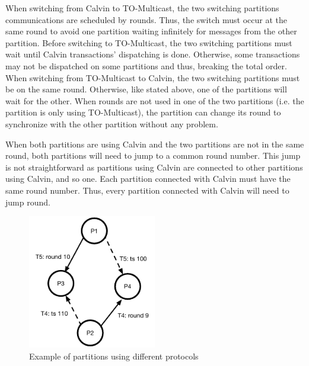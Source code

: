 \documentclass[a4paper, 10pt]{article}
\newcommand{\GE}{TO-Multicast}
\newcommand{\PE}{Calvin}
\newcommand{\Li}[1]{\mynote{Li}{#1}{blue}}
\newcommand{\Ch}[1]{\mynote{Ch}{#1}{green}}
\begin{document}
   When switching from \PE{} to \GE{}, the two switching partitions communications are
   scheduled by rounds. Thus, the switch must occur at the same round to avoid one partition
   waiting infinitely for messages from the other partition. Before switching to \GE{},
   the two switching partitions must wait until \PE{} transactions' dispatching is done.
   Otherwise, some transactions may not be dispatched on some partitions and thus, breaking
   the total order. \\

   When switching from \GE{} to \PE{}, the two switching partitions must be on the same
   round. Otherwise, like stated above, one of the partitions will wait for the other.
   When rounds are not used in one of the two partitions (i.e. the partition is
   only using \GE{}), the partition can change its round to synchronize with the other
   partition without any problem.

   When both partitions are using \PE{} and the two partitions are not in the
   same round, both partitions will need to jump to a common round number. This
   jump is not straightforward as partitions using \PE{} are connected to
   other partitions using \PE{}, and so one. Each partition connected with \PE{}
   must have the same round number. Thus, every partition connected with \PE{}
   will need to jump round.



\begin{figure}
    \centering
    \includegraphics[width=0.5\textwidth]{assets/inconsistency}
    \caption{Example of partitions using different protocols}
    \label{fig:inconsistency}
\end{figure}
\end{document}
